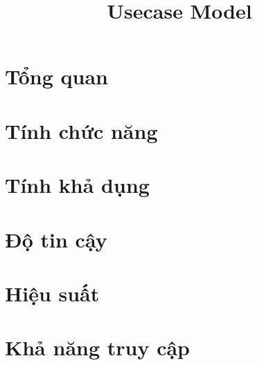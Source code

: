\documentclass[12pt, a4paper]{article}
\title{Usecase Model}
\begin{document}
	
	
	\clearpage
	
	\clearpage
	
	\tableofcontents 
	\clearpage
	
	
	
	
	
	 
	
	
	
	\section{Tổng quan}
	
	
	\section{Tính chức năng}
	
	
	\section{Tính khả dụng}
	
	
	\section{Độ tin cậy}
	
	
	\section{Hiệu suất}
	
	
	\section{Khả năng truy cập}
	
	
\end{document}
